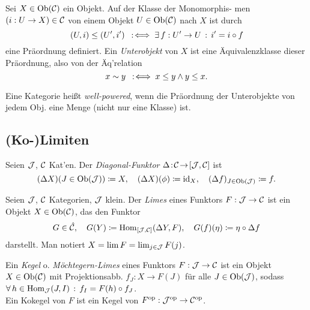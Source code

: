 \documentclass{cheat-sheet}
\begin{document}
\begin{defn}
  Sei $X \in \operatorname{Ob}(\mathcal{C})$ ein Objekt. Auf der Klasse der Monomorphis- men $(i : U \to X) \in \mathcal{C}$ von einem Objekt $U \in \operatorname{Ob}(\mathcal{C})$ nach $X$ ist durch
  \[ (U, i) \leq (U', i') \enspace:\!\iff \exists \, {f : U' \to U} \,:\, i' = i \circ f \]
  eine Präordnung definiert. Ein \emph{Unterobjekt} von $X$ ist eine Äquivalenzklasse dieser Präordnung, also von der Äq'relation
  \[ x \sim y \enspace:\!\iff x \leq y \wedge y \leq x. \]
\end{defn}

\begin{defn}
  Eine Kategorie heißt \emph{well-powered}, wenn die Präordnung der Unterobjekte von jedem Obj. eine Menge (nicht nur eine Klasse) ist.
\end{defn}


\subsection{(Ko-)Limiten}


\begin{defn}
  Seien $\mathcal{J}$, $\mathcal{C}$ Kat'en.
  Der \emph{Diagonal-Funktor} $\Delta \!:\! \mathcal{C} \!\to\! [\mathcal{J}, \mathcal{C}]$ ist
  \[
    (\Delta X)(J \in \operatorname{Ob}(\mathcal{J})) \coloneqq X, \quad
    (\Delta X)(\phi) \coloneqq \operatorname{id}_X, \quad
    (\Delta f)_{J \in \operatorname{Ob}(\mathcal{J})} \coloneqq f.
  \]
\end{defn}

\begin{defn}
  Seien $\mathcal{J}$, $\mathcal{C}$ Kategorien, $\mathcal{J}$ klein. Der \emph{Limes} eines Funktors $F : \mathcal{J} \to \mathcal{C}$ ist ein Objekt $X \in \operatorname{Ob}(\mathcal{C})$, das den Funktor
  \[
    G \in \hat{\mathcal{C}}, \quad
    G(Y) \coloneqq \operatorname{Hom}_{[\mathcal{J}, \mathcal{C}]}(\Delta Y, F), \quad
    G(f)(\eta) \coloneqq \eta \circ \Delta f
  \]
  darstellt. Man notiert $X = \lim F = \lim_{j \in \mathcal{J}} F(j)$.
\end{defn}


\begin{defn}
  Ein \emph{Kegel} o. \emph{Möchtegern-Limes} eines Funktors $F : \mathcal{J} \to \mathcal{C}$
  ist ein Objekt $X \in \operatorname{Ob}(\mathcal{C})$ mit Projektionsabb. $f_J : X \to F(J)$
  für alle $J \in \operatorname{Ob}(\mathcal{J})$, sodass
  $\forall \, {h \in \operatorname{Hom}_{\mathcal{J}}(J, I)} \,:\, f_I = F(h) \circ f_J$. \\
  Ein Kokegel von $F$ ist ein Kegel von $F^{\mathrm{op}} : \mathcal{J}^{\mathrm{op}} \to \mathcal{C}^{\mathrm{op}}$.
\end{defn}
\end{document}
